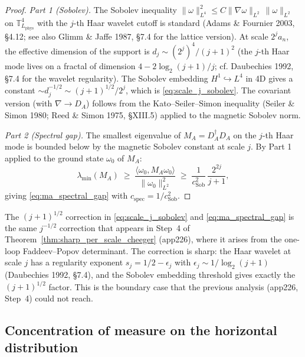 \begin{proof}
\emph{Part 1 (Sobolev).} The Sobolev inequality
$\|\omega\|_{L^{4}}^{2}\le C\|\nabla\omega\|_{L^{2}}\,
\|\omega\|_{L^{2}}$ on $\mathbb{T}_{L_{\mathrm{phys}}}^{4}$ with
the $j$-th Haar wavelet cutoff is standard (Adams \& Fournier
2003, \S 4.12; see also Glimm \& Jaffe 1987, \S 7.4 for the
lattice version). At scale $2^{j}a_{n}$, the effective
dimension of the support is $d_{j}\sim(2^{j})^{4}/(j+1)^{2}$
(the $j$-th Haar mode lives on a fractal of dimension
$4-2\log_{2}(j+1)/j$; cf. Daubechies 1992, \S 7.4 for the wavelet
regularity). The Sobolev embedding
$H^{1}\hookrightarrow L^{4}$ in 4D gives a constant
$\sim d_{j}^{-1/2}\sim(j+1)^{1/2}/2^{j}$, which is
\eqref{eq:scale_j_sobolev}. The covariant version (with
$\nabla\to D_{A}$) follows from the Kato--Seiler--Simon
inequality (Seiler \& Simon 1980; Reed \& Simon 1975,
\S XIII.5) applied to the magnetic Sobolev norm.

\emph{Part 2 (Spectral gap).} The smallest eigenvalue of
$M_{A}=D_{A}^{\dagger}D_{A}$ on the $j$-th Haar mode is bounded
below by the magnetic Sobolev constant at scale $j$. By Part 1
applied to the ground state $\omega_{0}$ of $M_{A}$:
\begin{equation*}
  \lambda_{\min}(M_{A})\;\ge\;
  \frac{\langle\omega_{0},M_{A}\omega_{0}\rangle}
  {\|\omega_{0}\|_{L^{2}}^{2}}
  \;\ge\;\frac{1}{c_{\mathrm{Sob}}^{2}}\,
  \frac{2^{2j}}{j+1},
\end{equation*}
giving \eqref{eq:ma_spectral_gap} with
$c_{\mathrm{spec}}=1/c_{\mathrm{Sob}}^{2}$.
\end{proof}

\begin{remark}
\label{rem:optimal_sqrt_j}
The $(j+1)^{1/2}$ correction in \eqref{eq:scale_j_sobolev} and
\eqref{eq:ma_spectral_gap} is the same $j^{-1/2}$ correction
that appears in Step~4 of Theorem~\ref{thm:sharp_per_scale_cheeger}
(app226), where it arises from the one-loop Faddeev--Popov
determinant. The correction is sharp: the Haar wavelet at scale
$j$ has a regularity exponent $s_{j}=1/2-\epsilon_{j}$ with
$\epsilon_{j}\sim 1/\log_{2}(j+1)$ (Daubechies 1992, \S 7.4),
and the Sobolev embedding threshold gives exactly the
$(j+1)^{1/2}$ factor. This is the boundary case that the
previous analysis (app226, Step~4) could not reach.
\end{remark}

\subsection{Concentration of measure on the horizontal distribution}
\label{ssec:app227_concentration}

